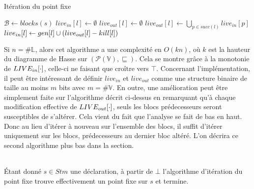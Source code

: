 \documentclass[a4paper, 10pt]{article}
\begin{document}
\begin{algorithm}[H]
	\caption{Itération du point fixe}
	\begin{algorithmic}
		\State $\mathcal{B} \leftarrow blocks(s)$
		\State $live_{in}[l] \leftarrow \emptyset$
		\State $live_{out}[l] \leftarrow \emptyset$
		\EndFor
		\State $live_{out}[l] \leftarrow \bigcup\limits_{p\in succ(l)} live_{in}[p]$
		\State $live_{in}[l] \leftarrow gen[l] \cup (live_{out}[l] - kill[l])$
		\EndFor
		\EndWhile
	\end{algorithmic}
\end{algorithm}
Si $n = \#\mathbb{L}$, alors cet algorithme a une complexité en $O(kn)$, où $k$ est la hauteur du diagramme
de Hasse sur $(\mathcal{P}(\mathbb{V}), \sqsubseteq)$. Cela se montre grâce à la monotonie de $LIVE_{in}[\cdot]$, 
celle-ci ne faisant que croître vers $\top$.
Concernant l'implémentation, il peut être intéressant de définir $live_{in}$ et $live_{out}$ comme une structure binaire de taille au
moins $m$ bits avec $m = \#\mathbb{V}$.
En outre, une amélioration peut être simplement faite sur l'algorithme décrit ci-dessus en remarquant qu'à chaque 
modification effective de $LIVE_{out}[\cdot]$, seuls les blocs prédecesseurs seront susceptibles de s'altérer. Cela
vient du fait que l'analyse se fait de bas en haut. Donc
au lieu d'itérer à nouveau sur l'ensemble des blocs, il suffit d'itérer uniquement sur les blocs, prédecesseurs au dernier
bloc altéré. L'on décrira ce second algorithme plus bas dans la section. 
\\
\\
\begin{lemma}
	Étant donné $s \in Stm$ une déclaration, à partir de $\bot$ l'algorithme d'itération du point fixe trouve effectivement
	un point fixe sur $s$ et termine.
\end{lemma}
\\
\end{document}
